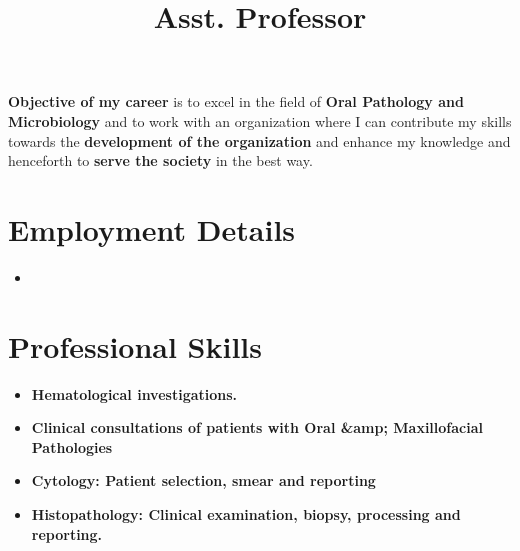 \documentclass[11pt,a4paper,sans]{moderncv}        %
\title{Asst. Professor}                               %
\begin{document}
\makecvtitle

\textbf{Objective of my career} is to excel in the field of \textbf{Oral Pathology and Microbiology} and to work with an
organization where I can contribute my skills towards the \textbf{development of the
organization} and enhance my knowledge and henceforth to \textbf{serve the society} in the
best way.

\section{Employment Details}

\vspace{6pt}

\begin{itemize}

\item{
{\vspace{3pt}
}}
\vspace{6pt}

\end{itemize}



\section{Professional Skills}
\vspace{5pt}
\begin{itemize}
\item{\textbf{Hematological investigations.}} \textit{}
\item{\textbf{Clinical consultations of patients with Oral &amp; Maxillofacial Pathologies}} \textit{}
\item{\textbf{Cytology: Patient selection, smear and reporting}} \textit{}
\item{\textbf{Histopathology: Clinical examination, biopsy, processing and reporting.}}\textit{}
\end{itemize}
\end{document}
